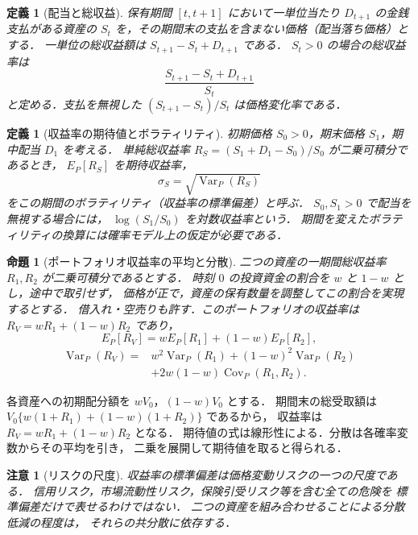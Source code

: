 \documentclass[a5paper,10pt,onecolumn]{jsarticle}
\makeatletter
\theoremstyle{mathnotetheorem}
\newtheorem{definition}[theorem]{定義}
\newtheorem{proposition}[theorem]{命題}
\newtheorem{remark}[theorem]{注意}
\renewcommand{\proofname}{証明}
\renewenvironment{proof}[1][\proofname]{%
  \par\pushQED{\qed}\normalfont\topsep4\p@\@plus2\p@\relax
  \trivlist\item[\hskip\labelsep\bfseries #1]\ignorespaces
}{\popQED\endtrivlist\@endpefalse}
\makeatother
\begin{document}
\begin{definition}[配当と総収益]
保有期間 $[t,t+1]$ において一単位当たり $D_{t+1}$ の金銭支払がある資産の
$S_t$ を，その期間末の支払を含まない価格（\emph{配当落ち価格}）とする．
一単位の\emph{総収益額}は $S_{t+1}-S_t+D_{t+1}$ である．
$S_t>0$ の場合の\emph{総収益率}は
\[
 \frac{S_{t+1}-S_t+D_{t+1}}{S_t}
\]
と定める．支払を無視した $(S_{t+1}-S_t)/S_t$ は価格変化率である．
\end{definition}

\begin{definition}[収益率の期待値とボラティリティ]
初期価格 $S_0>0$，期末価格 $S_1$，期中配当 $D_1$ を考える．
単純総収益率 $R_S=(S_1+D_1-S_0)/S_0$ が二乗可積分であるとき，
$E_P[R_S]$ を\emph{期待収益率}，
\[
 \sigma_S=\sqrt{\operatorname{Var}_P(R_S)}
\]
をこの期間の\emph{ボラティリティ}（収益率の標準偏差）と呼ぶ．
$S_0,S_1>0$ で配当を無視する場合には，
$\log(S_1/S_0)$ を\emph{対数収益率}という．
期間を変えたボラティリティの換算には確率モデル上の仮定が必要である．
\end{definition}

\begin{proposition}[ポートフォリオ収益率の平均と分散]
二つの資産の一期間総収益率 $R_1,R_2$ が二乗可積分であるとする．
時刻 $0$ の投資資金の割合を $w$ と $1-w$ とし，途中で取引せず，
価格が正で，資産の保有数量を調整してこの割合を実現するとする．
借入れ・空売りも許す．このポートフォリオの収益率は
$R_V=wR_1+(1-w)R_2$ であり，
\[
 E_P[R_V]=wE_P[R_1]+(1-w)E_P[R_2],
\]
\[
 \begin{split}
 \operatorname{Var}_P(R_V)
 ={}&w^2\operatorname{Var}_P(R_1)
 +(1-w)^2\operatorname{Var}_P(R_2)\\
 &+2w(1-w)\operatorname{Cov}_P(R_1,R_2).
 \end{split}
\]
\end{proposition}
\begin{proof}
各資産への初期配分額を $wV_0$，$(1-w)V_0$ とする．
期間末の総受取額は
$V_0\{w(1+R_1)+(1-w)(1+R_2)\}$ であるから，
収益率は $R_V=wR_1+(1-w)R_2$ となる．
期待値の式は線形性による．分散は各確率変数からその平均を引き，
二乗を展開して期待値を取ると得られる．\end{proof}

\begin{remark}[リスクの尺度]
収益率の標準偏差は価格変動リスクの一つの尺度である．
信用リスク，市場流動性リスク，保険引受リスク等を含む全ての危険を
標準偏差だけで表せるわけではない．
二つの資産を組み合わせることによる分散低減の程度は，
それらの共分散に依存する．
\end{remark}
\end{document}
